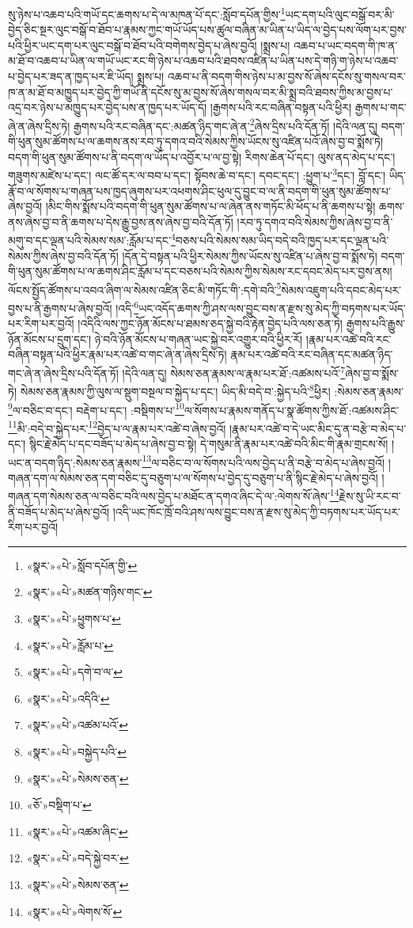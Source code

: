 སུ་ཉེས་པ་འཆབ་པའི་གཡོ་དང་ཆགས་པ་དེ་ལ་མཁན་པོ་དང་:སློབ་དཔོན་གྱིས་\footnote{«སྣར་»«པེ་»སློབ་དཔོན་གྱི་}ཡང་དག་པའི་ལུང་བསྒོ་བར་མི་བྱེད་ཅིང་སྔར་ལུང་བསྒོ་བ་ཐོབ་པ་རྣམས་ཀྱང་གཡོ་ཡོད་པས་ཚུལ་བཞིན་མ་ཡིན་པ་ཡིད་ལ་བྱེད་པས་ལོག་པར་བྱས་པའི་ཕྱིར་ཡང་དག་པར་ལུང་བསྒོ་བ་ཐོབ་པའི་བགེགས་བྱེད་པ་ཞེས་བྱའོ། །སྨྲས་པ། འཆབ་པ་ཡང་བདག་གི་ཁ་ན་མ་ཐོ་བ་འཆབ་པ་ཡིན་ལ་གཡོ་ཡང་རང་གི་ཉེས་པ་འཆབ་པའི་ཐབས་འཛིན་པ་ཡིན་པས་དེ་གཉི་ག་ཉེས་པ་འཆབ་པ་བྱེད་པར་ཟད་ན་ཁྱད་པར་ཇི་ཡོད། སྨྲས་པ། འཆབ་པ་ནི་བདག་གིས་ཉེས་པ་མ་བྱས་སོ་ཞེས་དངོས་སུ་གསལ་བར་ཁ་ན་མ་ཐོ་བ་མཁྱུད་པར་བྱེད་ཀྱི་གཡོ་ནི་དངོས་སུ་མ་བྱས་སོ་ཞེས་གསལ་བར་མི་སྨྲ་བའི་ཐབས་ཀྱིས་མ་བྱས་པ་འདྲ་བར་ཉེས་པ་མཁྱུད་པར་བྱེད་པས་ན་ཁྱད་པར་ཡོད་དོ། །རྒྱགས་པའི་རང་བཞིན་བསྟན་པའི་ཕྱིར། རྒྱགས་པ་གང་ཞེ་ན་ཞེས་དྲིས་ཏེ། རྒྱགས་པའི་རང་བཞིན་དང་:མཚན་ཉིད་གང་ཞེ་ན་\footnote{«སྣར་»«པེ་»མཚན་གཉིས་གང་}ཞེས་དྲིས་པའི་དོན་ཏོ། །དེའི་ལན་དུ། བདག་གི་ཕུན་སུམ་ཚོགས་པ་ལ་ཆགས་ནས་རབ་ཏུ་དགའ་བའི་སེམས་ཀྱིས་ཡོངས་སུ་འཛིན་པའོ་ཞེས་བྱ་བ་སྨོས་ཏེ། བདག་གི་ཕུན་སུམ་ཚོགས་པ་ནི་བདག་ལ་ཡོད་པ་འབྱོར་པ་ལ་བྱ་སྟེ། རིགས་ཆེན་པོ་དང་། ལུས་ནད་མེད་པ་དང་། གཟུགས་མཛེས་པ་དང་། ལང་ཚོ་དར་ལ་བབ་པ་དང་། སྟོབས་ཆེ་བ་དང་། དབང་དང་། :ཕྱུག་པ་\footnote{«སྣར་»«པེ་»ཕྱུགས་པ་}དང་། བློ་དང་། ཡིད་རྣོ་བ་ལ་སོགས་པ་གཞན་པས་ཁྱད་ཞུགས་པར་འཕགས་ཤིང་ཕུལ་དུ་བྱུང་བ་ལ་ནི་བདག་གི་ཕུན་སུམ་ཚོགས་པ་ཞེས་བྱའོ། །མིང་གིས་སྨོས་པའི་བདག་གི་ཕུན་སུམ་ཚོགས་པ་ལ་ཞེན་ནས་གཏོང་མི་ཕོད་པ་ནི་ཆགས་པ་སྟེ། ཆགས་ནས་ཞེས་བྱ་བ་ནི་ཆགས་པ་དེས་རྒྱུ་བྱས་ནས་ཞེས་བྱ་བའི་དོན་ཏོ། །རབ་ཏུ་དགའ་བའི་སེམས་ཀྱིས་ཞེས་བྱ་བ་ནི་མགུ་བ་དང་ལྡན་པའི་སེམས་སམ་:རློམ་པ་དང་\footnote{«སྣར་»«པེ་»རློམ་པ་}བཅས་པའི་སེམས་སམ་ཡིད་བདེ་བའི་ཁྱད་པར་དང་ལྡན་པའི་སེམས་ཀྱིས་ཞེས་བྱ་བའི་དོན་ཏོ། །དོན་དེ་བསྟན་པའི་ཕྱིར་སེམས་ཀྱིས་ཡོངས་སུ་འཛིན་པ་ཞེས་བྱ་བ་སྨོས་ཏེ། བདག་གི་ཕུན་སུམ་ཚོགས་པ་ལ་ཆགས་ཤིང་རློམ་པ་དང་བཅས་པའི་སེམས་ཀྱིས་སེམས་རང་དབང་མེད་པར་བྱས་ནས། ལོངས་སྤྱོད་ཚོགས་པ་འབའ་ཞིག་ལ་སེམས་འཛིན་ཅིང་མི་གཏོང་གི་:དགེ་བའི་\footnote{«སྣར་»«པེ་»དགེ་བ་ལ་}སེམས་འཇུག་པའི་དབང་མེད་པར་བྱས་པ་ནི་རྒྱགས་པ་ཞེས་བྱའོ། །འདི་\footnote{«སྣར་»«པེ་»འདིའི་}ཡང་འདོད་ཆགས་ཀྱི་ཤས་ལས་བྱུང་བས་ན་རྫས་སུ་མེད་ཀྱི་བཏགས་པར་ཡོད་པར་རིག་པར་བྱའོ། །འདིའི་ལས་ཀྱང་ཉོན་མོངས་པ་ཐམས་ཅད་སྐྱེ་བའི་རྟེན་བྱེད་པའི་ལས་ཅན་ཏེ། རྒྱགས་པའི་རྒྱུས་ཉོན་མོངས་པ་དྲུག་དང་། ཉེ་བའི་ཉོན་མོངས་པ་གཞན་ཡང་སྐྱེ་བར་འགྱུར་བའི་ཕྱིར་རོ། །རྣམ་པར་འཚེ་བའི་རང་བཞིན་བསྟན་པའི་ཕྱིར་རྣམ་པར་འཚེ་བ་གང་ཞེ་ན་ཞེས་དྲིས་ཏེ། རྣམ་པར་འཚེ་བའི་རང་བཞིན་དང་མཚན་ཉིད་གང་ཞེ་ན་ཞེས་དྲིས་པའི་དོན་ཏོ། །དེའི་ལན་དུ། སེམས་ཅན་རྣམས་ལ་རྣམ་པར་ཐོ་:འཚམས་པའོ་\footnote{«སྣར་»«པེ་»འཚམ་པའོ་}ཞེས་བྱ་བ་སྨོས་ཏེ། སེམས་ཅན་རྣམས་ཀྱི་ལུས་ལ་སྡུག་བསྔལ་བ་སྐྱེད་པ་དང་། ཡིད་མི་བདེ་བ་:སྐྱེད་པའི་\footnote{«སྣར་»«པེ་»བསྐྱེད་པའི་}ཕྱིར། :སེམས་ཅན་རྣམས་\footnote{«སྣར་»«པེ་»སེམས་ཅན་}ལ་བཅིང་བ་དང་། བརྡེག་པ་དང་། :བསྡིགས་པ་\footnote{«ཅོ་»བསྡིག་པ་}ལ་སོགས་པ་རྣམས་གནོད་པ་སྣ་ཚོགས་ཀྱིས་ཐོ་:འཚམས་ཤིང་\footnote{«སྣར་»«པེ་»འཚམ་ཞིང་}མི་:བདེ་བ་སྐྱེད་པར་\footnote{«སྣར་»«པེ་»བདེ་སྐྱེ་བར་}བྱེད་པ་ལ་རྣམ་པར་འཚེ་བ་ཞེས་བྱའོ། །རྣམ་པར་འཚེ་བ་དེ་ཡང་མིང་དུ་ན་བརྩེ་བ་མེད་པ་དང་། སྙིང་རྗེ་མེད་པ་དང་བཟོད་པ་མེད་པ་ཞེས་བྱ་བ་སྟེ། དེ་གསུམ་ནི་རྣམ་པར་འཚེ་བའི་མིང་གི་རྣམ་གྲངས་སོ། །ཡང་ན་བདག་ཉིད་:སེམས་ཅན་རྣམས་\footnote{«སྣར་»«པེ་»སེམས་ཅན་}ལ་བཅིང་བ་ལ་སོགས་པའི་ལས་བྱེད་པ་ནི་བརྩེ་བ་མེད་པ་ཞེས་བྱའོ། །གཞན་དག་ལ་སེམས་ཅན་དག་བཅིང་དུ་བཅུག་པ་ལ་སོགས་པ་བྱེད་དུ་བཅུག་པ་ནི་སྙིང་རྗེ་མེད་པ་ཞེས་བྱའོ། །གཞན་དག་སེམས་ཅན་ལ་བཅིང་བའི་ལས་བྱེད་པ་མཐོང་ན་དགའ་ཞིང་དེ་ལ་:ལེགས་སོ་ཞེས་\footnote{«སྣར་»«པེ་»ལེགས་སོ་}རྗེས་སུ་ཡི་རང་བ་ནི་བཟོད་པ་མེད་པ་ཞེས་བྱའོ། །འདི་ཡང་ཁོང་ཁྲོ་བའི་ཤས་ལས་བྱུང་བས་ན་རྫས་སུ་མེད་ཀྱི་བཏགས་པར་ཡོད་པར་རིག་པར་བྱའོ། 
